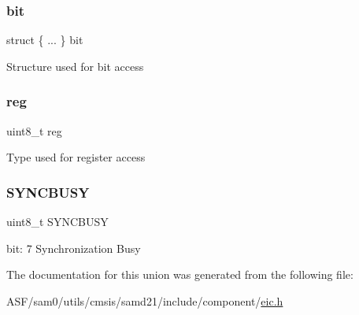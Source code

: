 \subsubsection{\texorpdfstring{bit}{bit}}
{\footnotesize\ttfamily struct \{ ... \}   bit}

Structure used for bit access \mbox{\label{union_e_i_c___s_t_a_t_u_s___type_a9428adc9af4653a2050e2536b55dec8d}} 
\subsubsection{\texorpdfstring{reg}{reg}}
{\footnotesize\ttfamily uint8\+\_\+t reg}

Type used for register access \mbox{\label{union_e_i_c___s_t_a_t_u_s___type_abb30254758e23bd24824e436a1aa8716}} 
\subsubsection{\texorpdfstring{SYNCBUSY}{SYNCBUSY}}
{\footnotesize\ttfamily uint8\+\_\+t S\+Y\+N\+C\+B\+U\+SY}

bit\+: 7 Synchronization Busy 

The documentation for this union was generated from the following file\+:\begin{DoxyCompactItemize}
\item 
A\+S\+F/sam0/utils/cmsis/samd21/include/component/\mbox{\hyperlink{component_2eic_8h}{eic.\+h}}\end{DoxyCompactItemize}
